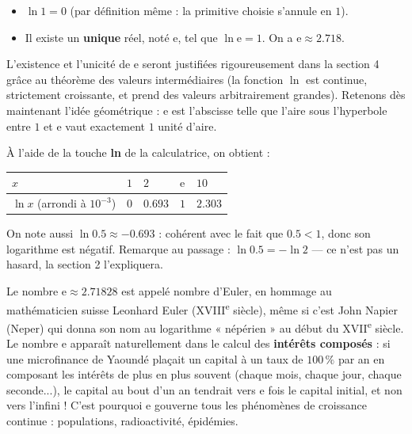 \documentclass[11pt]{article}
\newcommand{\cle}[1]{{\popxbold\color{popdark}#1}}
\begin{document}
\begin{propriete}
\begin{itemize}
\item $\ln 1 = 0$ (par définition même : la primitive choisie s'annule en $1$).
\item Il existe un \textbf{unique} réel, noté $\mathrm{e}$, tel que $\ln \mathrm{e} = 1$. On a $\mathrm{e} \approx \num{2.718}$.
\end{itemize}
\end{propriete}

L'existence et l'unicité de $\mathrm{e}$ seront justifiées rigoureusement dans la section 4 grâce au théorème des valeurs intermédiaires (la fonction $\ln$ est continue, strictement croissante, et prend des valeurs arbitrairement grandes). Retenons dès maintenant l'idée géométrique : $\mathrm{e}$ est l'abscisse telle que l'aire sous l'hyperbole entre $1$ et $\mathrm{e}$ vaut exactement $1$ unité d'aire.

\begin{exemplebox}
À l'aide de la touche \textbf{ln} de la calculatrice, on obtient :
\begin{center}
\begin{tabularx}{\linewidth}{|l|X|X|X|X|}
\hline
\rowcolor{popblueL}
$x$ & \centering $1$ & \centering $2$ & \centering $\mathrm{e}$ & \centering\arraybackslash $10$ \\
\hline
$\ln x$ (arrondi à $10^{-3}$) & \centering $0$ & \centering $\num{0.693}$ & \centering $1$ & \centering\arraybackslash $\num{2.303}$ \\
\hline
\end{tabularx}
\end{center}
On note aussi $\ln \num{0.5} \approx \num{-0.693}$ : cohérent avec le fait que $\num{0.5} < 1$, donc son logarithme est négatif. Remarque au passage : $\ln \num{0.5} = -\ln 2$ — ce n'est pas un hasard, la section 2 l'expliquera.
\end{exemplebox}

\begin{savaistu}
Le nombre $\mathrm{e} \approx \num{2.71828}$ est appelé \cle{nombre d'Euler}, en hommage au mathématicien suisse Leonhard Euler (XVIII\textsuperscript{e} siècle), même si c'est John Napier (Neper) qui donna son nom au logarithme « népérien » au début du XVII\textsuperscript{e} siècle. Le nombre $\mathrm{e}$ apparaît naturellement dans le calcul des \textbf{intérêts composés} : si une microfinance de Yaoundé plaçait un capital à un taux de $100\,\%$ par an en composant les intérêts de plus en plus souvent (chaque mois, chaque jour, chaque seconde...), le capital au bout d'un an tendrait vers $\mathrm{e}$ fois le capital initial, et non vers l'infini ! C'est pourquoi $\mathrm{e}$ gouverne tous les phénomènes de croissance continue : populations, radioactivité, épidémies.
\end{savaistu}
\end{document}
